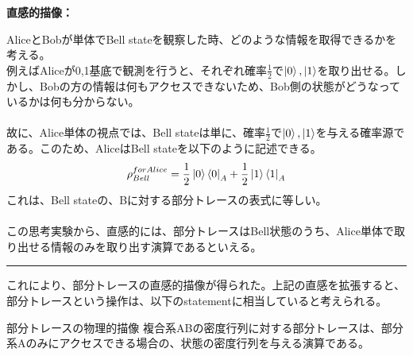 \documentclass[a4paper,10.5pt]{article}
\numberwithin{equation}{section}
\newenvironment{intuitionbox}
{\begin{prooflabel}\textbf{直感的描像：}\end{prooflabel}\vspace{0.8em}}
{\par\vspace{1em}\hrule\vspace{1em}}
\begin{document}
\begin{intuitionbox}
AliceとBobが単体でBell stateを観察した時、どのような情報を取得できるかを考える。\\
例えばAliceが0,1基底で観測を行うと、それぞれ確率$\frac{1}{2}$で$\ket{0},\ket{1}$を取り出せる。しかし、Bobの方の情報は何もアクセスできないため、Bob側の状態がどうなっているかは何も分からない。\\
\\
故に、Alice単体の視点では、Bell stateは単に、確率$\frac{1}{2}$で$\ket{0},\ket{1}$を与える確率源である。このため、AliceはBell stateを以下のように記述できる。
\begin{align}
\rho_{Bell}^{for Alice}=\frac{1}{2}\ket{0}\bra{0}_{A}+\frac{1}{2}\ket{1}\bra{1}_{A}
\end{align}
これは、Bell stateの、Bに対する部分トレースの表式に等しい。\\
\\
この思考実験から、直感的には、部分トレースはBell状態のうち、Alice単体で取り出せる情報のみを取り出す演算であるといえる。
\end{intuitionbox}
これにより、部分トレースの直感的描像が得られた。上記の直感を拡張すると、部分トレースという操作は、以下のstatementに相当していると考えられる。
\begin{resultbox}{部分トレースの物理的描像}
複合系ABの密度行列に対する部分トレースは、部分系Aのみにアクセスできる場合の、状態の密度行列を与える演算である。
\end{resultbox}
\end{document}

